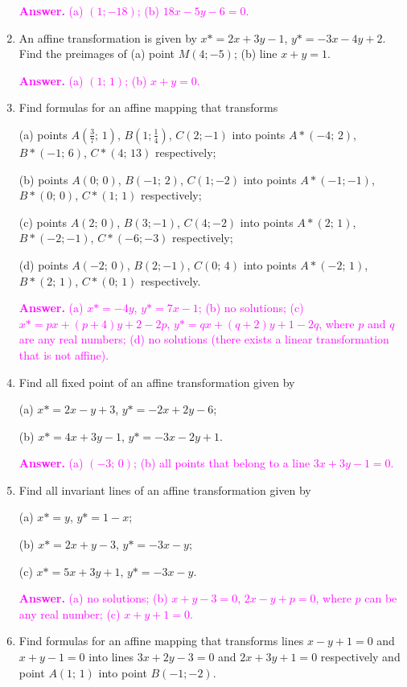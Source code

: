 \documentclass[a4paper,10pt]{article}
\begin{document}
\begin{enumerate}
\textcolor{magenta}{\textbf{Answer.} (a) $(1;-18)$; (b) $18x-5y-6=0$.}    

\item An affine transformation is given by $x*=2x+3y-1$, $y*=-3x-4y+2$. Find the preimages of (a) point $M(4;-5)$; (b) line $x+y=1$.
    
\textcolor{magenta}{\textbf{Answer.} (a) $(1;\,1)$; (b) $x+y=0$.}    
    
\item Find formulas for an affine mapping that transforms

(a) points $A(\frac37;\,1)$, $B(1;\frac14)$, $C(2;-1)$ into points $A*(-4;\,2)$, $B*(-1;\,6)$, $C*(4;\,13)$ respectively;

(b) points $A(0;\,0)$, $B(-1;\,2)$, $C(1;-2)$ into points $A*(-1;-1)$, $B*(0;\,0)$, $C*(1;\,1)$ respectively;

(c) points $A(2;\,0)$, $B(3;-1)$, $C(4;-2)$ into points $A*(2;\,1)$, $B*(-2;-1)$, $C*(-6;-3)$ respectively;

(d) points $A(-2;\,0)$, $B(2;-1)$, $C(0;\,4)$ into points $A*(-2;\,1)$, $B*(2;\,1)$, $C*(0;\,1)$ respectively.

\textcolor{magenta}{\textbf{Answer.} (a) $x*=-4y$, $y*=7x-1$; (b) no solutions; (c) $x*=px+(p+4)y+2-2p$, $y*=qx+(q+2)y+1-2q$, where $p$ and $q$ are any real numbers; (d) no solutions (there exists a linear transformation that is not affine).}

\item Find all fixed point of an affine transformation given by

(a) $x*=2x-y+3$, $y*=-2x+2y-6$;

(b) $x*=4x+3y-1$, $y*=-3x-2y+1$.

\textcolor{magenta}{\textbf{Answer.} (a) $(-3;\,0)$; (b) all points that belong to a line $3x+3y-1=0$.}

\item Find all invariant lines of an affine transformation given by

(a) $x*=y$, $y*=1-x$;

(b) $x*=2x+y-3$, $y*=-3x-y$;

(c) $x*=5x+3y+1$, $y*=-3x-y$.

\textcolor{magenta}{\textbf{Answer.} (a) no solutions; (b) $x+y-3=0$, $2x-y+p=0$, where $p$ can be any real number; (c) $x+y+1=0$.}

\item Find formulas for an affine mapping that transforms lines $x-y+1=0$ and $x+y-1=0$ into lines $3x+2y-3=0$ and $2x+3y+1=0$ respectively and point $A(1;\,1)$ into point $B(-1;-2)$.
    

\end{enumerate}
\end{document}

